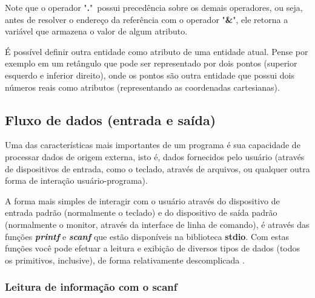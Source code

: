 \documentclass[12pt]{article}
\newcommand\tab[1][1cm]{\hspace*{#1}}
\begin{document}
\hspace{0.25cm}
\begin{tcolorbox}[colback=yellow!5!white,colframe=yellow!75!black,title=Atenção!]
  \par\tab Note que o operador "\textbf{.}"~possui precedência sobre os demais operadores, ou seja, antes de resolver o endereço da referência com o operador "\textbf{\&}", ele retorna a variável que armazena o valor de algum atributo.
\end{tcolorbox}

\begin{tcolorbox}[colback=blue!5!white,colframe=blue!75!black,title=Dica!]
  \par\tab É possível definir outra entidade como atributo de uma entidade atual. Pense por exemplo em um retângulo que pode ser representado por dois pontos (superior esquerdo e inferior direito), onde os pontos são outra entidade que possui dois números reais como atributos (representando as coordenadas cartesianas).
\end{tcolorbox}

\newpage

\subsection{Fluxo de dados (entrada e saída)}

\par\tab Uma das características mais importantes de um programa é sua capacidade de processar dados de origem externa, isto é, dados fornecidos pelo usuário (através de dispositivos de entrada, como o teclado, através de arquivos, ou qualquer outra forma de interação usuário-programa).

\par\tab A forma mais simples de interagir com o usuário através do dispositivo de entrada padrão (normalmente o teclado) e do dispositivo de saída padrão (normalmente o monitor, através da interface de linha de comando), é através das funções \textbf{\textit{printf}} e \textbf{\textit{scanf}} que estão disponíveis na biblioteca \textbf{stdio}. Com estas funções você pode efetuar a leitura e exibição de diversos tipos de dados (todos os primitivos, inclusive), de forma relativamente descomplicada \cite{site:printf_scanf}.

\subsubsection{Leitura de informação com o scanf}
\end{document}
